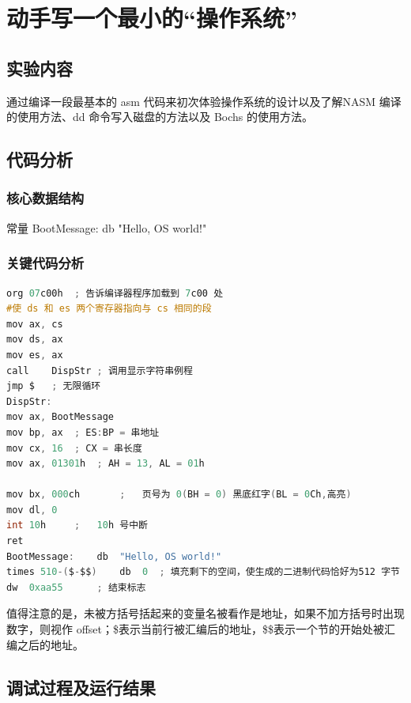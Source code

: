 \chapter{动手写一个最小的“操作系统”}
 
\section{实验内容}

通过编译一段最基本的 asm 代码来初次体验操作系统的设计以及了解NASM 编译的使用方法、dd 命令写入磁盘的方法以及 Bochs 的使用方法。

\section{代码分析}

\subsection{核心数据结构}
常量 BootMessage:	db "Hello, OS world!"

\subsection{关键代码分析}

\begin{lstlisting}[language = C]
org 07c00h	; 告诉编译器程序加载到 7c00 处
#使 ds 和 es 两个寄存器指向与 cs 相同的段
mov ax, cs
mov ds, ax
mov es, ax
call	DispStr	; 调用显示字符串例程
jmp $	; 无限循环
DispStr:
mov ax, BootMessage
mov bp, ax	; ES:BP = 串地址
mov cx, 16	; CX = 串长度
mov ax, 01301h	; AH = 13, AL = 01h

mov bx,	000ch		;	页号为 0(BH = 0) 黑底红字(BL = 0Ch,高亮)
mov dl,	0			
int 10h		;	10h	号中断
ret				
BootMessage:	db	"Hello, OS world!"
times 510-($-$$)	db	0  ; 填充剩下的空间，使生成的二进制代码恰好为512 字节		
dw	0xaa55		; 结束标志
\end{lstlisting}
值得注意的是，未被方括号括起来的变量名被看作是地址，如果不加方括号时出现数字，则视作 offset；\$表示当前行被汇编后的地址，\$\$表示一个节的开始处被汇编之后的地址。

\section{调试过程及运行结果}


